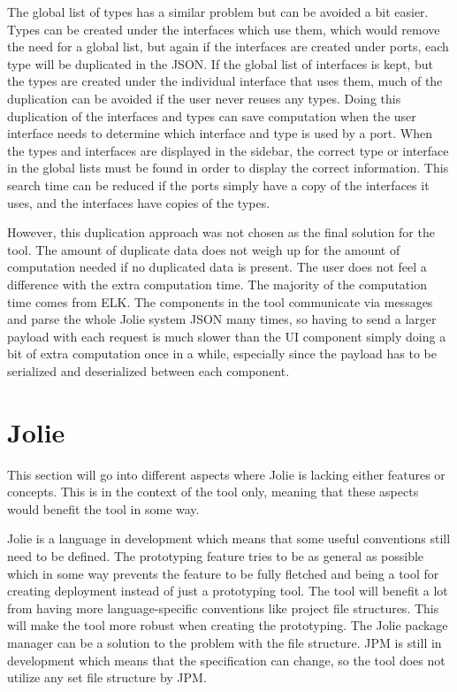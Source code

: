 The global list of types has a similar problem but can be avoided a bit easier. Types can be created under the interfaces which use them, which would remove the need for a global list, but again if the interfaces are created under ports, each type will be duplicated in the JSON. 
If the global list of interfaces is kept, but the types are created under the individual interface that uses them, much of the duplication can be avoided if the user never reuses any types. Doing this duplication of the interfaces and types can save computation when the user interface needs to determine which interface and type is used by a port. 
When the types and interfaces are displayed in the sidebar, the correct type or interface in the global lists must be found in order to display the correct information. This search time can be reduced if the ports simply have a copy of the interfaces it uses, and the interfaces have copies of the types.

However, this duplication approach was not chosen as the final solution for the tool.
The amount of duplicate data does not weigh up for the amount of computation needed if no duplicated data is present.
The user does not feel a difference with the extra computation time. The majority of the computation time comes from ELK.
The components in the tool communicate via messages and parse the whole Jolie system JSON many times, so having to send a larger payload with each request is much slower than the UI component simply doing a bit of extra computation once in a while, especially since the payload has to be serialized and deserialized between each component.

\section{Jolie}
This section will go into different aspects where Jolie is lacking either features or concepts.
This is in the context of the tool only, meaning that these aspects would benefit the tool in some way.

Jolie is a language in development which means that some useful conventions still need to be defined.
The prototyping feature tries to be as general as possible which in some way prevents the feature to be fully fletched
and being a tool for creating deployment instead of just a prototyping tool.
The tool will benefit a lot from having more language-specific conventions like project file structures.
This will make the tool more robust when creating the prototyping. The Jolie package manager can be a solution
to the problem with the file structure. JPM is still in development which means that the specification can change, so the tool does not utilize any set file structure by JPM.

